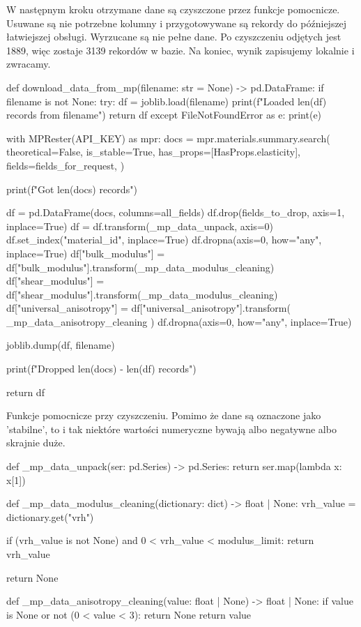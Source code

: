 \hspace{1.5cm} W następnym kroku otrzymane dane są czyszczone przez funkcje pomocnicze.
Usuwane są nie potrzebne kolumny i przygotowywane są rekordy do późniejszej łatwiejszej obsługi.
Wyrzucane są nie pełne dane. 
Po czyszczeniu odjętych jest 1889, więc zostaje 3139 rekordów w bazie.  
Na koniec, wynik zapisujemy lokalnie i zwracamy.
\begin{pythoncode}
def download_data_from_mp(filename: str = None) -> pd.DataFrame:
    if filename is not None:
        try:
            df = joblib.load(filename)
            print(f"Loaded {len(df)} records from {filename}")
            return df
        except FileNotFoundError as e:
            print(e)

    with MPRester(API_KEY) as mpr:
        docs = mpr.materials.summary.search(
            theoretical=False,
            is_stable=True,
            has_props=[HasProps.elasticity],
            fields=fields_for_request,
        )

    print(f"Got {len(docs)} records")

    df = pd.DataFrame(docs, columns=all_fields)
    df.drop(fields_to_drop, axis=1, inplace=True)
    df = df.transform(_mp_data_unpack, axis=0)
    df.set_index("material_id", inplace=True)
    df.dropna(axis=0, how="any", inplace=True)
    df["bulk_modulus"] = df["bulk_modulus"].transform(_mp_data_modulus_cleaning)
    df["shear_modulus"] = df["shear_modulus"].transform(_mp_data_modulus_cleaning)
    df["universal_anisotropy"] = df["universal_anisotropy"].transform(
        _mp_data_anisotropy_cleaning
    )
    df.dropna(axis=0, how="any", inplace=True)

    joblib.dump(df, filename)

    print(f"Dropped {len(docs) - len(df)} records")

    return df
\end{pythoncode}

\hspace{1.5cm} Funkcje pomocnicze przy czyszczeniu. 
Pomimo że dane są oznaczone jako 'stabilne', to i tak niektóre wartości numeryczne bywają albo negatywne albo skrajnie duże.
\begin{pythoncode}
def _mp_data_unpack(ser: pd.Series) -> pd.Series:
    return ser.map(lambda x: x[1])


def _mp_data_modulus_cleaning(dictionary: dict) -> float | None:
    vrh_value = dictionary.get("vrh")

    if (vrh_value is not None) and 0 < vrh_value < modulus_limit:
        return vrh_value

    return None


def _mp_data_anisotropy_cleaning(value: float | None) -> float | None:
    if value is None or not (0 < value < 3):
        return None
    return value
\end{pythoncode}
